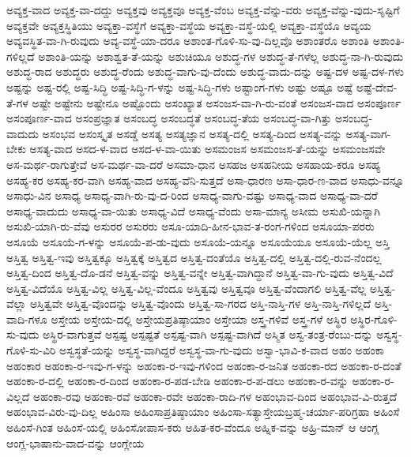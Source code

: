 {ಅವ್ಯಕ್ತ-ವಾದ
ಅವ್ಯಕ್ತ-ವಾ-ದದ್ದು
ಅವ್ಯಕ್ತವು
ಅವ್ಯಕ್ತವೂ
ಅವ್ಯಕ್ತ-ವೆಂಬ
ಅವ್ಯಕ್ತ-ವೆನ್ನು-ವರು
ಅವ್ಯಕ್ತ-ವೆನ್ನು-ವುದು-ಸೃಷ್ಟಿಗೆ
ಅವ್ಯಕ್ತವೇ
ಅವ್ಯಕ್ತಸ್ಥಿತಿಯು
ಅವ್ಯಕ್ತಾ-ವಸ್ಥೆಗೆ
ಅವ್ಯಕ್ತಾ-ವಸ್ಥೆಯ
ಅವ್ಯಕ್ತಾ-ವಸ್ಥೆ-ಯಲ್ಲಿ
ಅವ್ಯಕ್ತಾ-ವಸ್ಥೆಯೊ
ಅವ್ಯಯ
ಅವ್ಯವಸ್ಥಿತ-ವಾ-ಗಿ-ರುವುದು
ಅವ್ಯ-ವಸ್ಥೆ-ಯಾ-ದರೂ
ಅಶಾಂತ-ಗೊಳಿ-ಸು-ವು-ದಿಲ್ಲವೊ
ಅಶಾಂತರೊ
ಅಶಾಂತಿ
ಅಶಾಂತಿ-ಗಳಿಲ್ಲದೆ
ಅಶಾಂತಿ-ಯನ್ನು
ಅಶಾಶ್ವತ-ತೆ-ಯನ್ನು
ಅಶುಚಿಯೂ
ಅಶುದ್ಧ-ಗಳ
ಅಶುದ್ಧ-ತೆ-ಗಳೆಲ್ಲ
ಅಶುದ್ಧ-ನಾ-ಗಿ-ರುವುದು
ಅಶುದ್ಧ-ರಾದ
ಅಶುದ್ಧರು
ಅಶುದ್ಧ-ರೆಂದು
ಅಶುದ್ಧ-ವಾಗು-ವು-ದೆಂದು
ಅಶುದ್ಧ-ವಾದು-ದನ್ನು
ಅಷ್ಟ-ದಳ
ಅಷ್ಟ-ದಳ-ಗಳು
ಅಷ್ಟನ್ನು
ಅಷ್ಟ-ರಲ್ಲಿ
ಅಷ್ಟ-ಸಿದ್ಧಿ
ಅಷ್ಟ-ಸಿದ್ಧಿ-ಗ-ಳನ್ನು
ಅಷ್ಟ-ಸಿದ್ಧಿ-ಗಳು
ಅಷ್ಟಾಂಗ-ಗಳು
ಅಷ್ಟು
ಅಷ್ಟೂ
ಅಷ್ಟೆ
ಅಷ್ಟೆ-ದೇವ-ತೆ-ಗಳ
ಅಷ್ಟೇ
ಅಷ್ಟೇನು
ಅಷ್ಟೇನೂ
ಅಷ್ಟೊಂದು
ಅಸಂಖ್ಯಾತ
ಅಸಂಜಸ-ವಾ-ಗಿ-ರು-ವಂತೆ
ಅಸಂಜಸ-ವಾದ
ಅಸಂಪೂರ್ಣ
ಅಸಂಪೂರ್ಣ-ವಾದ
ಅಸಂಪ್ರಜ್ಞಾತ
ಅಸಂಬದ್ಧ
ಅಸಂಬದ್ಧತೆ
ಅಸಂಬದ್ಧ-ತೆಯ
ಅಸಂಬದ್ಧ-ವಾ-ಗಿತ್ತು
ಅಸಂಬದ್ಧ-ವಾದುದು
ಅಸಂಭವ
ಅಸಂಸ್ಕೃತ
ಅಸಡ್ಡೆ
ಅಸತ್ಯ
ಅಸತ್ಯಜ್ಞಾನ
ಅಸತ್ಯ-ದಲ್ಲಿ
ಅಸತ್ಯ-ದಿಂದ
ಅಸತ್ಯ-ವನ್ನು
ಅಸತ್ಯ-ವಾಗ-ಬೇಕು
ಅಸತ್ಯ-ವಾದ
ಅಸದ-ಳ-ವಾದ
ಅಸದ-ಳ-ವಾ-ಯಿತು
ಅಸಮಂಜಸ
ಅಸಮಂಜಸ-ತೆ-ಯನ್ನು
ಅಸಮಂಜಸವೇ
ಅಸ-ಮರ್ಥ-ರಾಗುತ್ತೇವೆ
ಅಸ-ಮರ್ಥ-ವಾ-ದರೆ
ಅಸಮಾ-ಧಾನ
ಅಸಹಜ
ಅಸಹನೀಯ
ಅಸಹಾಯ-ಕರೂ
ಅಸಹ್ಯ
ಅಸಹ್ಯ-ಕರ
ಅಸಹ್ಯ-ಕರ-ವಾಗಿ
ಅಸಹ್ಯ-ವಾದ
ಅಸಹ್ಯ-ವೆನಿ-ಸುತ್ತದೆ
ಅಸಾ-ಧಾರಣ
ಅಸಾ-ಧಾರ-ಣ-ವಾದ
ಅಸಾಧು-ವನ್ನೂ
ಅಸಾಧು-ವಿನ
ಅಸಾಧ್ಯ
ಅಸಾಧ್ಯ-ವಾಗಿ-ರು-ವು-ದ-ರಿಂದ
ಅಸಾಧ್ಯ-ವಾಗು-ವಷ್ಟು
ಅಸಾಧ್ಯ-ವಾದ
ಅಸಾಧ್ಯ-ವಾ-ದರೆ
ಅಸಾಧ್ಯ-ವಾದುದು
ಅಸಾಧ್ಯ-ವಾ-ಯಿತು
ಅಸಾಧ್ಯ-ವಿದೆ
ಅಸಾಧ್ಯ-ವೆಂದು
ಅಸಾ-ಮಾನ್ಯ
ಅಸೀಮ
ಅಸುಖಿ-ಯನ್ನಾಗಿ
ಅಸುಖಿ-ಯಾಗಿ-ರು-ವೆವು
ಅಸುರರ
ಅಸುರರು
ಅಸೂ-ಯಾದಿ-ಹೀನ-ಭಾವ-ತ-ರಂಗ-ಗಳಿಂದ
ಅಸೂಯಾ-ಪರರು
ಅಸೂಯೆ
ಅಸೂಯೆ-ಗ-ಳನ್ನು
ಅಸೂಯೆ-ಪ-ಡು-ವುದು
ಅಸೂಯೆ-ಯನ್ನೂ
ಅಸೂಯೆಯೂ
ಅಸೂಯೆ-ಯೆಲ್ಲ
ಅಸ್ತಿ
ಅಸ್ತಿತ್ವ
ಅಸ್ತಿತ್ವ-ಇವು
ಅಸ್ತಿತ್ವಕ್ಕೂ
ಅಸ್ತಿತ್ವಕ್ಕೆ
ಅಸ್ತಿತ್ವದ
ಅಸ್ತಿತ್ವ-ದಂತೆಯೊ
ಅಸ್ತಿತ್ವ-ದಲ್ಲಿ
ಅಸ್ತಿತ್ವ-ದಲ್ಲಿ-ರುವ-ನೆಂದಲ್ಲ
ಅಸ್ತಿತ್ವ-ದಿಂದ
ಅಸ್ತಿತ್ವ-ದೊ-ಡನೆ
ಅಸ್ತಿತ್ವ-ವನ್ನು
ಅಸ್ತಿತ್ವ-ವನ್ನೇ
ಅಸ್ತಿತ್ವ-ವಾಗಿದ್ದಾನೆ
ಅಸ್ತಿತ್ವ-ವಾ-ಗು-ವುದು
ಅಸ್ತಿತ್ವ-ವಿದೆ
ಅಸ್ತಿತ್ವ-ವಿದೆಯೊ
ಅಸ್ತಿತ್ವ-ವಿಲ್ಲ
ಅಸ್ತಿತ್ವ-ವಿಲ್ಲ-ವೆಂದೂ
ಅಸ್ತಿತ್ವವು
ಅಸ್ತಿತ್ವವೂ
ಅಸ್ತಿತ್ವ-ವೆಂದಾಗಲಿ
ಅಸ್ತಿತ್ವ-ವೆಲ್ಲ
ಅಸ್ತಿತ್ವ-ವೆಲ್ಲಾ
ಅಸ್ತಿತ್ವವೇ
ಅಸ್ತಿತ್ವ-ವೊಂದನ್ನು
ಅಸ್ತಿತ್ವ-ವೊಂದು
ಅಸ್ತಿತ್ವ-ಸಾ-ಗರದ
ಅಸ್ತಿ-ನಾಸ್ತಿ-ಗಳ
ಅಸ್ತಿ-ನಾಸ್ತಿ-ಗಳಿಲ್ಲದೆ
ಅಸ್ತಿ-ವಾದಿ-ಗಳೂ
ಅಸ್ತೇಯ
ಅಸ್ತೇಯ-ದಲ್ಲಿ
ಅಸ್ತೇಯಪ್ರತಿಷ್ಠಾಯಾಂ
ಅಸ್ತೇಯಾ
ಅಸ್ತ್ರ-ಗಳಿವೆ
ಅಸ್ತ್ರ-ಗಳೆ
ಅಸ್ಥಿರ
ಅಸ್ಥಿರ-ಗೊಳಿ-ಸು-ವುದು
ಅಸ್ಥಿರ-ವಾಗುತ್ತವೆ
ಅಸ್ಪಷ್ಟ
ಅಸ್ಪಷ್ಟತೆ
ಅಸ್ಪಷ್ಟ-ವಾಗಿ
ಅಸ್ಪಷ್ಟ-ವಾಗಿದೆ
ಅಸ್ಮಿತ
ಅಸ್ವ-ತಂತ್ರ-ರೆಂಬು-ದನ್ನು
ಅಸ್ವಸ್ಥ-ಗೊಳಿ-ಸು-ವಿರಿ
ಅಸ್ವಸ್ಥತೆ-ಯನ್ನು
ಅಸ್ವಸ್ಥ-ವಾಗಿದ್ದರೆ
ಅಸ್ವಸ್ಥ-ವಾ-ಗು-ವುದು
ಅಸ್ವಾ-ಭಾವಿ-ಕ-ವಾದ
ಅಹಂ
ಅಹಂಕಾ
ಅಹಂಕಾರ
ಅಹಂಕಾ-ರ-ಇವು-ಗ-ಳನ್ನು
ಅಹಂಕಾ-ರ-ಇವು-ಗಳಿಂದ
ಅಹಂಕಾ-ರ-ಜನಿತ
ಅಹಂಕಾ-ರದ
ಅಹಂಕಾ-ರ-ದಂತೆ
ಅಹಂಕಾ-ರ-ದಲ್ಲಿ
ಅಹಂಕಾ-ರ-ದಿಂದ
ಅಹಂಕಾ-ರ-ಪಡ-ಬೇಡಿ
ಅಹಂಕಾ-ರ-ಪ-ಡಲು
ಅಹಂಕಾ-ರ-ವನ್ನು
ಅಹಂಕಾ-ರ-ವಿಲ್ಲದೆ
ಅಹಂಕಾ-ರವು
ಅಹಂಕಾ-ರವೆ
ಅಹಂಕಾ-ರವೇ
ಅಹಂಕಾ-ರಾದಿ-ಗಳ
ಅಹಂಭಾವ-ದಿಂದ
ಅಹಂಭಾವ-ವಿ-ರುತ್ತದೆ
ಅಹಂಭಾವ-ವಿರು-ವು-ದಿಲ್ಲ
ಅಹಿಂಸಾ
ಅಹಿಂಸಾಪ್ರತಿಷ್ಠಾಯಾಂ
ಅಹಿಂಸಾ-ಸತ್ಯಾಸ್ತೇಯಬ್ರಹ್ಮ-ಚರ್ಯಾ-ಪರಿಗ್ರಹಾ
ಅಹಿಂಸೆ
ಅಹಿಂಸೆ-ಗಿಂತ
ಅಹಿಂಸೆ-ಯಲ್ಲಿ
ಅಹಿಂಸೋಪಾಸ-ಕರು
ಅಹಿತ-ಕರ-ವೆಂದೂ
ಅಹ್ನಿಕ-ವನ್ನು
ಅಹ್ರಿ-ಮಾನ್
ಆ
ಆಂಗ್ಲ
ಆಂಗ್ಲ-ಭಾಷಾನು-ವಾದ-ವನ್ನು
ಆಂಗ್ಲೇಯ
}
